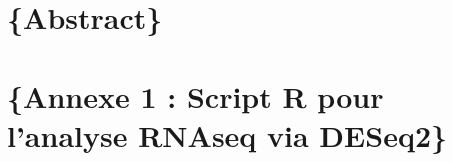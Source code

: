 \documentclass[
  12pt,
]{article}
\begin{document}
\hypertarget{abstract}{%
\section{\texorpdfstring{\Large\{Abstract\}}{\{Abstract\}}}\label{abstract}}

\newpage

\hypertarget{annexe-1-script-r-pour-lanalyse-rnaseq-via-deseq2}{%
\section{\texorpdfstring{\Large\{Annexe 1 : Script R pour l'analyse
RNAseq via
DESeq2\}}{\{Annexe 1 : Script R pour l'analyse RNAseq via DESeq2\}}}\label{annexe-1-script-r-pour-lanalyse-rnaseq-via-deseq2}}

\renewcommand{\baselinestretch}{.85}
\scriptsize
\end{document}
